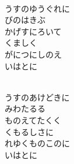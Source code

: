 \documentclass[10pt,b5j]{tarticle} %
\begin{document}
\vspace{1.5em} %
\newcommand{\linespace}{0.5em} %
\newcommand{\blocksize}{0.5\hsize} %
\newcommand{\itemmargin}{3em} %
\begin{enumerate} %
    \setlength{\itemindent}{\itemmargin} %
    \begin{minipage}[c]{\blocksize}
    
        \vspace{\linespace}
        \item~\\
        うすのゆうぐれに\\
        びのはきぶ\\
        かげすにろいて\\
        くましく\\
        がにつにしのえ\\
        いはとに
        
    \end{minipage}
    \begin{minipage}[c]{\blocksize}
        
        \vspace{\linespace}
        \item~\\
        うすのあけどきに\\
        みわたるる\\
        ものえてたくく\\
        くもるしさに\\
        れゆくものこのに\\
        いはとに
        
    \end{minipage}
    \begin{minipage}[c]{\blocksize}
        

\end{minipage}
\end{enumerate}
\end{document}
